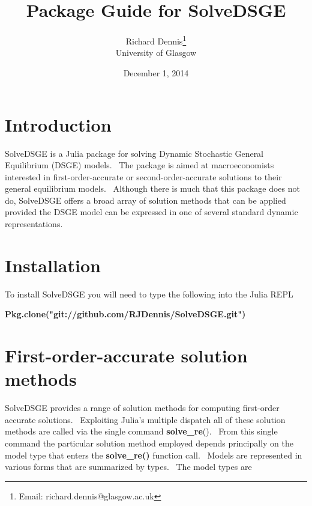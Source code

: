 \documentclass[thmsa,notitlepage,11pt]{article}
\begin{document}
\author{Richard Dennis\thanks{%
Email: richard.dennis@glasgow.ac.uk} \\
University of Glasgow}
\title{\textbf{Package Guide for SolveDSGE}\vspace{0.2in}}
\date{December 1, 2014}
\maketitle

\thispagestyle{empty}\newpage \setlength{\baselineskip}{18.95pt}%
\setcounter{page}{1}

\section{Introduction}

SolveDSGE is a Julia package for solving Dynamic Stochastic General
Equilibrium (DSGE) models. \ The package is aimed at macroeconomists
interested in first-order-accurate or second-order-accurate solutions to
their general equilibrium models. \ Although there is much that this package
does not do, SolveDSGE offers a broad array of solution methods that can be
applied provided the DSGE model can be expressed in one of several standard
dynamic representations.

\section{Installation}

To install SolveDSGE you will need to type the following into the Julia REPL

\bigskip

\textbf{Pkg.clone("git://github.com/RJDennis/SolveDSGE.git")}

\bigskip

\section{First-order-accurate solution methods}

SolveDSGE provides a range of solution methods for computing first-order
accurate solutions. \ Exploiting Julia's multiple dispatch all of these
solution methods are called via the single command \textbf{solve\_re}(). \
From this single command the particular solution method employed depends
principally on the model type that enters the \textbf{solve\_re()} function
call. \ Models are represented in various forms that are summarized by
types. \ The model types are
\end{document}
